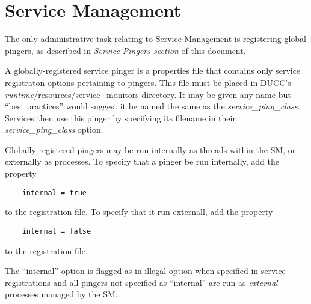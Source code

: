 % 
% 
% 
% 
\ifpdf
\else
{}
\fi
\chapter{Service Management}
\label{chap:sm}
    The only administrative task relating to Service Management is registering
    global pingers, as described in
    \hyperref[subsec:services.pingers]{\em Service Pingers section} of this document.

    A globally-registered service pinger is a properties file that contains only
    service registraton options pertaining to pingers.  This file must be placed
    in DUCC's {\em runtime}/resources/service\_monitors directory.  It may be
    given any name but ``best practices'' would suggest it be named the
    same as the {\em service\_ping\_class}.  Services then use this pinger
    by specifying its filename in their {\em service\_ping\_class} option.
    
    Globally-registered pingers may be run internally as threads within the
    SM, or externally as processes.  To specify that a pinger be run internally,
    add the property 
\begin{verbatim}
    internal = true
\end{verbatim}
    to the registration file.  To specify that it run externall, add the property
\begin{verbatim}
    internal = false
\end{verbatim}
    to the registration file.

    The ``internal'' option is flagged as in illegal option when
    specified in service registrations and all pingers not specified as
    ``internal'' are run as {\em external} processes managed by the SM.

